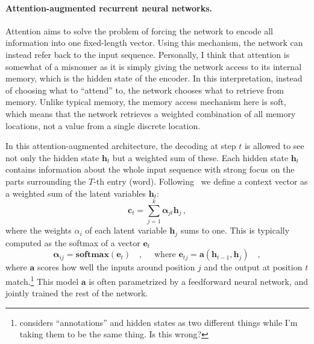 \documentclass[paper=a4, fontsize=11pt,twoside, abstracton]{scrartcl}
\def\hh{{\boldsymbol h}}
\begin{document}
\paragraph{Attention-augmented recurrent neural networks.} Attention aims to solve the problem of forcing the network to encode all information into one fixed-length vector. Using this mechanism, the network can instead refer back to the input sequence. Personally, I think that attention is somewhat of a misnomer as it is simply giving the network access to its internal memory, which is the hidden state of the encoder. In this interpretation, instead of choosing what to  ``attend'' to, the network chooses what to retrieve from memory. Unlike typical memory, the memory access mechanism here is soft, which means that the network retrieves a weighted combination of all memory locations, not a value from a single discrete location.

In this attention-augmented architecture, the decoding at step $t$ is allowed to see not only the hidden state $\hh_t$ but a weighted sum of these. Each hidden state $\hh_t$ contains information about the whole input sequence with strong focus on the parts surrounding the $T$-th entry (word). Following~\citep{bahdanau2014neural} we define a context vector as a weighted sum of the latent variables $\hh_t$:
\begin{equation}
  \boldsymbol{c}_t = \sum_{j=1}^k \boldsymbol{\alpha}_{jt} \hh_j\,,
\end{equation}
where the weights $\alpha_{i}$ of each latent variable $\hh_j$ sums to one. This is typically computed as the softmax of a vector $\boldsymbol{e}_t$
\begin{equation}
  \boldsymbol{\alpha}_{ij} = \textbf{softmax}(\boldsymbol{e}_t)\quad, \quad \text{ where } \boldsymbol{e}_{tj} = \boldsymbol{a}(\hh_{t-1}, \hh_j) \quad,
\end{equation}
where $\boldsymbol{a}$ scores how well the inputs around position $j$ and the output at position $t$ match.\footnote{\citet{bahdanau2014neural} considers ``annotations'' and hidden states as two different things while I'm taking them to be the same thing. Is this wrong?} This model $\boldsymbol{a}$ is often parametrized by a feedforward neural network, and jointly trained the rest of the network.
\end{document}
